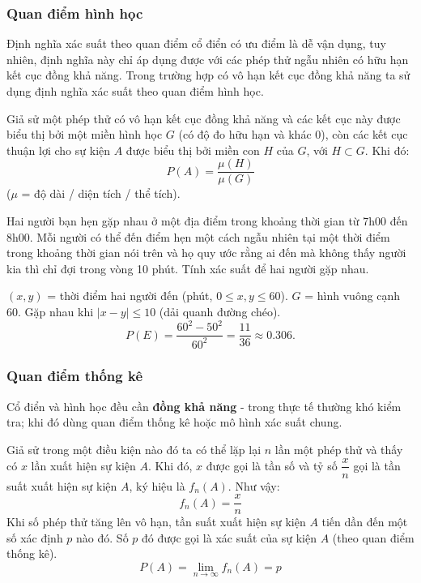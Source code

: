 \documentclass[12pt,a4paper]{article}
\begin{document}
\subsubsection{Quan điểm hình học}

\begin{dongco}
  Định nghĩa xác suất theo quan điểm cổ điển có ưu điểm là dễ vận dụng, tuy nhiên, định nghĩa này chỉ áp dụng được với các phép thử ngẫu nhiên có hữu hạn kết cục đồng khả năng. Trong trường hợp có vô hạn kết cục đồng khả năng ta sử dụng định nghĩa xác suất theo quan điểm hình học.
\end{dongco}

\begin{dinhnghia}
Giả sử một phép thử có vô hạn kết cục đồng khả năng và các kết cục này được biểu thị bởi một miền hình học $G$ (có độ đo hữu hạn và khác $0$), còn các kết cục thuận lợi cho sự kiện $A$ được biểu thị bởi miền con $H$ của $G$, với $H \subset G$. Khi đó:
  \[
    P(A) = \dfrac{\mu(H)}{\mu(G)}
  \]
  ($\mu$ = độ dài / diện tích / thể tích).
\end{dinhnghia}

\begin{vidu}[title={Hẹn gặp 7h-8h, chờ 10 phút}]
Hai người bạn hẹn gặp nhau ở một địa điểm trong khoảng thời gian từ 7h00 đến 8h00. Mỗi người có thể đến điểm hẹn một cách ngẫu nhiên tại một thời điểm trong khoảng thời gian nói trên và họ quy ước rằng ai đến mà không thấy người kia thì chỉ đợi trong vòng 10 phút. Tính xác suất để hai người gặp nhau.

$(x,y)$ = thời điểm hai người đến (phút, $0 \le x,y \le 60$). $G$ = hình vuông cạnh $60$. Gặp nhau khi $|x - y| \le 10$ (dải quanh đường chéo).
\[
  P(E) = \dfrac{60^2 - 50^2}{60^2} = \dfrac{11}{36} \approx 0.306.
\]
\end{vidu}

\subsubsection{Quan điểm thống kê}

\begin{dongco}
Cổ điển và hình học đều cần \textbf{đồng khả năng} - trong thực tế thường khó kiểm tra; khi đó dùng quan điểm thống kê hoặc mô hình xác suất chung.
\end{dongco}

\begin{dinhnghia}
Giả sử trong một điều kiện nào đó ta có thể lặp lại $n$ lần một phép thử và thấy có $x$ lần xuất hiện sự kiện $A$. Khi đó, $x$ được gọi là tần số và tỷ số $\dfrac{x}{n}$ gọi là tần suất xuất hiện sự kiện $A$, ký hiệu là $f_n(A)$. Như vậy:
\[
f_n(A) = \dfrac{x}{n}
\]
Khi số phép thử tăng lên vô hạn, tần suất xuất hiện sự kiện $A$ tiến dần đến một số xác định $p$ nào đó. Số $p$ đó được gọi là xác suất của sự kiện $A$ (theo quan điểm thống kê).
\[
P(A) = \lim_{n \to \infty} f_n(A) = p
\]
\end{dinhnghia}
\end{document}

